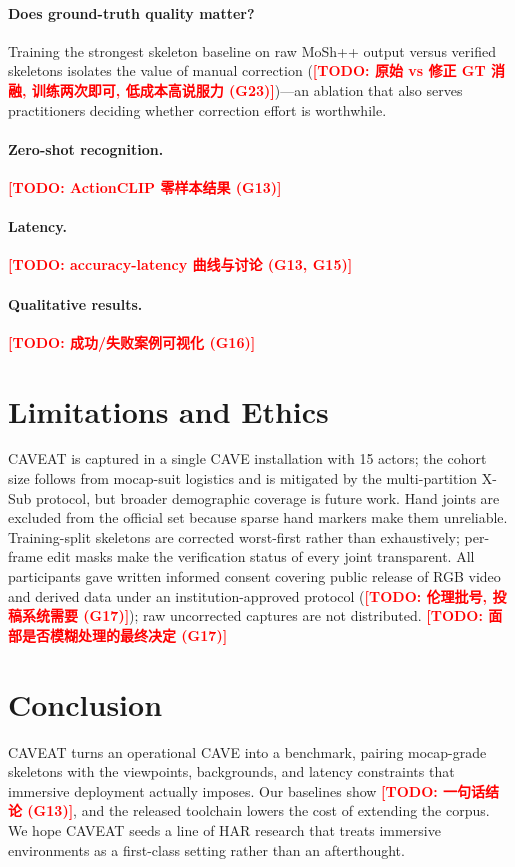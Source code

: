 \documentclass[10pt,twocolumn,letterpaper]{article}
\newcommand{\todocjkfont}{}
\newif\iftodos \todostrue   %
\newcommand{\todo}[1]{\iftodos\textcolor{red}{\textbf{[TODO: {\todocjkfont #1}]}}\fi}
\newcommand{\DATASET}{CAVEAT}
\begin{document}
\paragraph{Does ground-truth quality matter?}
Training the strongest skeleton baseline on raw MoSh++ output versus
verified skeletons isolates the value of manual correction
(\todo{原始 vs 修正 GT 消融, 训练两次即可, 低成本高说服力 (G23)})---an
ablation that also serves practitioners deciding whether correction effort
is worthwhile.
\paragraph{Zero-shot recognition.} \todo{ActionCLIP 零样本结果 (G13)}
\paragraph{Latency.} \todo{accuracy-latency 曲线与讨论 (G13, G15)}
\paragraph{Qualitative results.} \todo{成功/失败案例可视化 (G16)}

\section{Limitations and Ethics}
\DATASET{} is captured in a single CAVE installation with 15 actors; the
cohort size follows from mocap-suit logistics and is mitigated by the
multi-partition X-Sub protocol, but broader demographic coverage is future
work. Hand joints are excluded from the official set because sparse hand
markers make them unreliable. Training-split skeletons are corrected
worst-first rather than exhaustively; per-frame edit masks make the
verification status of every joint transparent. All participants gave
written informed consent covering public release of RGB video and derived
data under an institution-approved protocol
(\todo{伦理批号, 投稿系统需要 (G17)}); raw uncorrected captures are not
distributed. \todo{面部是否模糊处理的最终决定 (G17)}

\section{Conclusion}
\DATASET{} turns an operational CAVE into a benchmark, pairing
mocap-grade skeletons with the viewpoints, backgrounds, and latency
constraints that immersive deployment actually imposes. Our baselines show
\todo{一句话结论 (G13)}, and the released toolchain lowers the cost of
extending the corpus. We hope \DATASET{} seeds a line of HAR research that
treats immersive environments as a first-class setting rather than an
afterthought.

{\small


}
\end{document}
